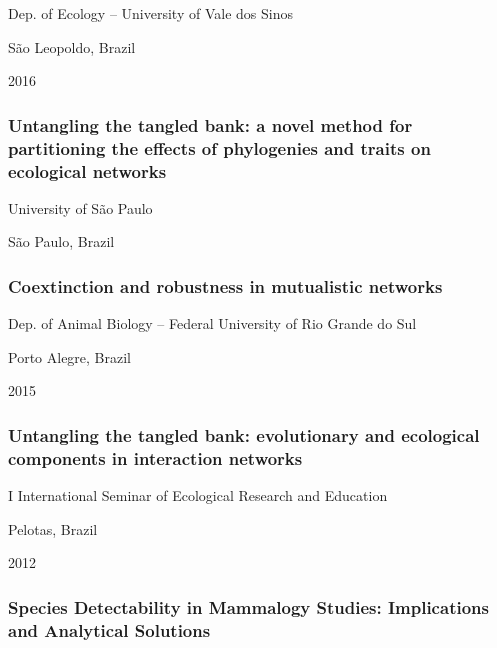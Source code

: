 \documentclass[
]{article}
\begin{document}
Dep. of Ecology -- University of Vale dos Sinos

São Leopoldo, Brazil

2016

\hypertarget{untangling-the-tangled-bank-a-novel-method-for-partitioning-the-effects-of-phylogenies-and-traits-on-ecological-networks}{%
\subsubsection{Untangling the tangled bank: a novel method for
partitioning the effects of phylogenies and traits on ecological
networks}\label{untangling-the-tangled-bank-a-novel-method-for-partitioning-the-effects-of-phylogenies-and-traits-on-ecological-networks}}

University of São Paulo

São Paulo, Brazil

\hypertarget{coextinction-and-robustness-in-mutualistic-networks}{%
\subsubsection{Coextinction and robustness in mutualistic
networks}\label{coextinction-and-robustness-in-mutualistic-networks}}

Dep. of Animal Biology -- Federal University of Rio Grande do Sul

Porto Alegre, Brazil

2015

\hypertarget{untangling-the-tangled-bank-evolutionary-and-ecological-components-in-interaction-networks}{%
\subsubsection{Untangling the tangled bank: evolutionary and ecological
components in interaction
networks}\label{untangling-the-tangled-bank-evolutionary-and-ecological-components-in-interaction-networks}}

I International Seminar of Ecological Research and Education

Pelotas, Brazil

2012

\hypertarget{species-detectability-in-mammalogy-studies-implications-and-analytical-solutions}{%
\subsubsection{Species Detectability in Mammalogy Studies: Implications
and Analytical
Solutions}\label{species-detectability-in-mammalogy-studies-implications-and-analytical-solutions}}
\end{document}
